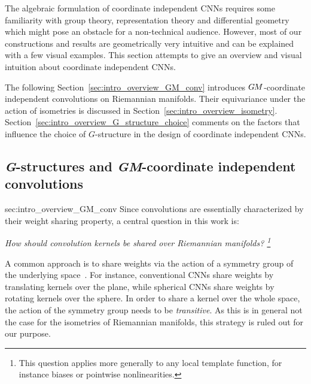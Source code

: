 The algebraic formulation of coordinate independent CNNs requires some familiarity with group theory, representation theory and differential geometry which might pose an obstacle for a non-technical audience.
However, most of our constructions and results are geometrically very intuitive and can be explained with a few visual examples.
This section attempts to give an overview and visual intuition about coordinate independent CNNs.

The following Section~\ref{sec:intro_overview_GM_conv} introduces $G\mkern-1.4muM$-coordinate independent convolutions on Riemannian manifolds.
Their equivariance under the action of isometries is discussed in Section~\ref{sec:intro_overview_isometry}.
Section~\ref{sec:intro_overview_G_structure_choice} comments on the factors that influence the choice of $G$-structure in the design of coordinate independent CNNs.




\toclesslab\subsection{\textit{G}-structures and \textit{GM}-coordinate independent convolutions}{sec:intro_overview_GM_conv}
Since convolutions are essentially characterized by their weight sharing property, a central question in this work is:
\vspace*{-1ex}
\begin{center}\it
    How should convolution kernels be shared over Riemannian manifolds?
    \footnote{
        This question applies more generally to any local template function, for instance biases or pointwise nonlinearities.
    }
\end{center}

\marginnote{} %


A common approach  is to share weights via the action of a symmetry group of the underlying space~\cite{Cohen2016-GCNN,Kondor2018-GENERAL}.
For instance, conventional CNNs share weights by translating kernels over the plane, while spherical CNNs share weights by rotating kernels over the sphere.
In order to share a kernel over the whole space, the action of the symmetry group needs to be \emph{transitive}.
As this is in general not the case for the isometries of Riemannian manifolds, this strategy is ruled out for our purpose.


